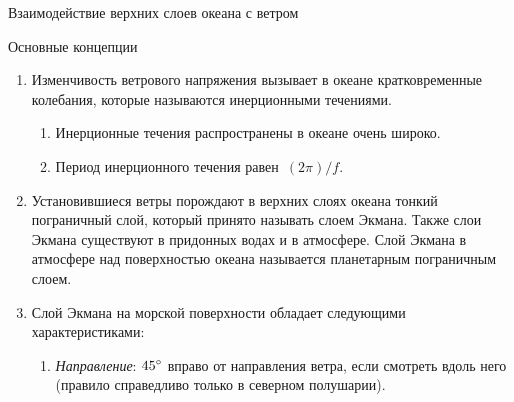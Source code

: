 \begin{chapter}{Взаимодействие верхних слоев океана с ветром}
\begin{section}{Основные концепции}
\begin{enumerate}
\item
Изменчивость ветрового напряжения%
вызывает в океане кратковременные колебания, которые называются инерционными
течениями.
%
%
\begin{enumerate}
\item 
Инерционные течения распространены в океане очень широко.
%

\item 
Период инерционного течения равен~$(2 \pi)/f$.
%
\end{enumerate}

\item Установившиеся ветры порождают в верхних слоях океана тонкий пограничный
слой, который принято называть слоем Экмана. Также слои Экмана существуют
в придонных водах и в атмосфере. Слой Экмана в атмосфере над поверхностью
океана называется планетарным пограничным слоем.
%

\item 
Слой Экмана на морской поверхности
обладает следующими характеристиками:
%
%
\begin{enumerate}
\item 
\textit{Направление}: ${45}^\circ$ вправо от направления ветра, 
если смотреть вдоль него (правило справедливо только в северном полушарии). 
%


\end{enumerate}
\end{enumerate}
\end{section}
\end{chapter}
